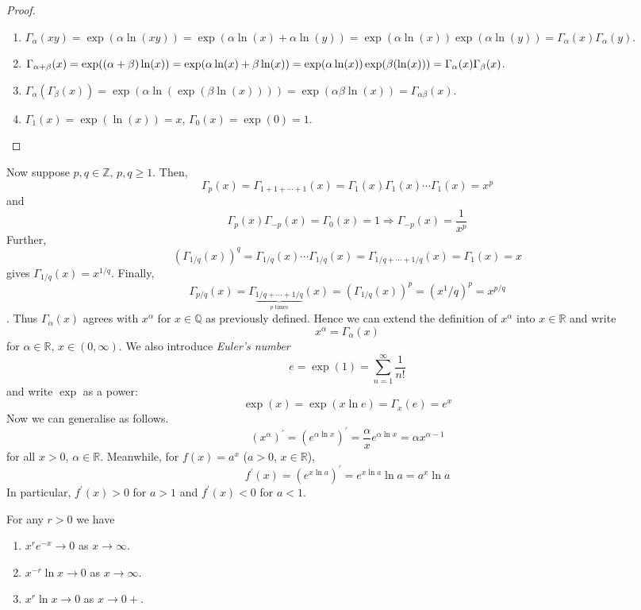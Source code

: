 \documentclass[10pt, a4paper, twoside]{report}
\begin{document}
\begin{proof} \item[]
    \begin{enumerate}
        \item \(
            \Gamma_\alpha(xy)=\exp(\alpha\ln(xy))=\exp(\alpha\ln(x)+\alpha\ln(y))=\exp(\alpha\ln(x))\exp(\alpha\ln(y))=\Gamma_\alpha(x)\Gamma_\alpha(y)
        \).
        \item \(\Gamma_{\alpha+\beta}(x)=\exp((\alpha+\beta)\ln(x))=\exp(\alpha\ln(x)+\beta\ln(x))\\=\exp(\alpha\ln(x))\exp(\beta(\ln(x)))=\Gamma_\alpha(x)\Gamma_\beta(x)\).
        \item \(\Gamma_\alpha(\Gamma_\beta(x))=\exp(\alpha\ln(\exp(\beta\ln(x))))=\exp(\alpha\beta\ln(x))=\Gamma_{\alpha\beta}(x)\).
        \item \(\Gamma_1(x)=\exp(\ln(x))=x\), \(\Gamma_0(x)=\exp(0)=1\).
    \end{enumerate}
\end{proof}
Now suppose \(p,q\in\mathbb{Z}\), \(p,q\geq 1\). Then,
\[\Gamma_p(x)=\Gamma_{1+1+\cdots+1}(x)=\Gamma_1(x)\Gamma_1(x)\cdots\Gamma_1(x)=x^p\]
and 
\[\Gamma_p(x)\Gamma_{-p}(x)=\Gamma_0(x)=1\Rightarrow\Gamma_{-p}(x)=\frac 1{x^p}\]
Further,
\[\left(\Gamma_{1/q}(x)\right)^q=\Gamma_{1/q}(x)\cdots\Gamma_{1/q}(x)=\Gamma_{1/q+\cdots+1/q}(x)=\Gamma_{1}(x)=x\]
gives \(\Gamma_{1/q}(x)=x^{1/q}\). Finally,
\[\Gamma_{p/q}(x)=\Gamma_{\underbrace{1/q+\cdots+1/q}_{p\text{  times}}}(x)=\left(\Gamma_{1/q}(x)\right)^p=(x^1/q)^p=x^{p/q}\].
Thus \(\Gamma_\alpha(x)\) agrees with \(x^\alpha\) for \(x\in\mathbb{Q}\) as previously defined. Hence we can extend the definition of \(x^\alpha\) into \(x\in\mathbb{R}\) and write 
\[x^\alpha=\Gamma_\alpha(x)\]
for \(\alpha\in\mathbb{R}\), \(x\in(0,\infty)\). We also introduce \emph{Euler's number}
\[e=\exp(1)=\sum_{n=1}^{\infty}\frac 1{n!}\]
and write \(\exp\) as a power:
\[\exp(x)=\exp(x\ln e)=\Gamma_x(e)=e^x\]
Now we can generalise as follows.
\[(x^\alpha)^\prime=(e^{\alpha\ln x})^\prime=\frac\alpha xe^{\alpha\ln x}=\alpha x^{\alpha-1}\]
for all \(x>0\), \(\alpha\in\mathbb{R}\). Meanwhile, for \(f(x)=a^x\) (\(a>0\), \(x\in\mathbb{R}\)),
\[f^\prime(x)=(e^{x\ln a})^\prime=e^{x\ln a}\ln a=a^x\ln a\]
In particular, \(f^\prime(x)>0\) for \(a>1\) and \(f^\prime(x)<0\) for \(a<1\).
\begin{lemma}
    For any \(r>0\) we have
    \begin{enumerate}
        \item \(x^re^{-x}\to 0\) as \(x\to\infty\).
        \item \(x^{-r}\ln x\to 0\) as \(x\to\infty\).
        \item \(x^r\ln x\to 0\) as \(x\to 0+\).
    \end{enumerate}
\end{lemma}
\end{document}
